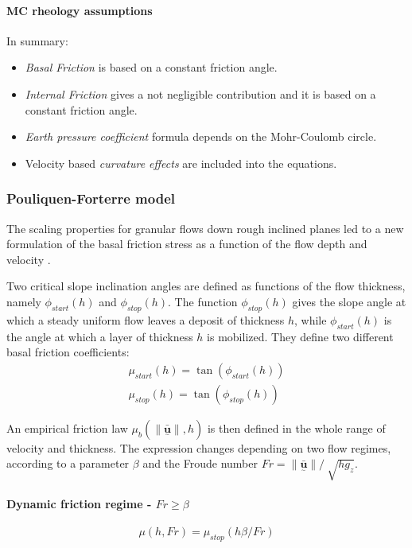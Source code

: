 \documentclass{article}
\begin{document}
\paragraph{MC rheology assumptions} In summary:
\begin{itemize}
\item \textit{Basal Friction} is based on a constant friction angle.

\item \textit{Internal Friction} gives a not negligible contribution and it is based on a constant friction angle.

\item \textit{Earth pressure coefficient} formula depends on the Mohr-Coulomb circle.

\item Velocity based \textit{curvature effects} are included into the equations.
\end{itemize}

\subsubsection{Pouliquen-Forterre model}\label{PFM}
The scaling properties for granular flows down rough inclined planes led to a new formulation of the basal friction stress as a function of the flow depth and velocity \citep{Pouliquen1999}.

Two critical slope inclination angles are defined as functions of the flow thickness, namely $\phi_{start}(h)$ and $\phi_{stop}(h)$. The function $\phi_{stop}(h)$ gives the slope angle at which a steady uniform flow leaves a deposit of thickness $h$, while $\phi_{start}(h)$ is the angle at which a layer of thickness $h$ is mobilized. They define two different basal friction coefficients:
\begin{eqnarray}
\mu_{start}(h)=\tan(\phi_{start}(h))\\
\mu_{stop}(h)=\tan(\phi_{stop}(h))
\end{eqnarray}

An empirical friction law $\mu_{b}(\|\underset{^\sim}{\bar{\textbf{u}}} \| , h)$ is then defined in the whole range of velocity and thickness. The expression changes depending on two flow regimes, according to a parameter $\beta$ and the Froude number $Fr=\| \underset{^\sim}{\bar{\textbf{u}}} \| / \ \sqrt{h g_{z}}$.

\paragraph{Dynamic friction regime - $Fr \ge \beta$}
\begin{equation}\label{mu_beta1}
\mu(h, Fr)=\mu_{stop}(h \beta / Fr)
\end{equation}
\end{document}
